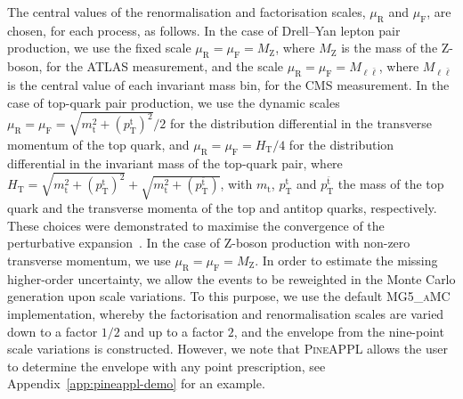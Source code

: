 The central values of the renormalisation and factorisation scales, $\mu_\mathrm{R}$ and
$\mu_\mathrm{F}$, are chosen, for each process, as follows. In the case of Drell--Yan
lepton pair production, we use the fixed scale $\mu_\mathrm{R}=\mu_\mathrm{F}=M_\mathrm{Z}$, where $M_\mathrm{Z}$ is
the mass of the Z-boson, for the ATLAS measurement, and the scale
$\mu_\mathrm{R}=\mu_\mathrm{F}=M_{\ell\bar\ell}$, where $M_{\ell\bar\ell}$ is the central value of each
invariant mass bin, for the CMS measurement.
In the case of top-quark pair production, we use the dynamic scales
$\mu_\mathrm{R}=\mu_\mathrm{F}=\sqrt{m_\mathrm{t}^2+(p_\mathrm{T}^\mathrm{t})^2}{\Big /}2$ for the distribution differential
in the transverse momentum of the top quark, and $\mu_\mathrm{R}=\mu_\mathrm{F}=H_\mathrm{T}/4$ for the
distribution differential in the invariant mass of the top-quark pair, where
$H_\mathrm{T}=\sqrt{m_\mathrm{t}^2+(p_\mathrm{T}^\mathrm{t})^2}+\sqrt{m_\mathrm{t}^2+(p_\mathrm{T}^{\bar{\mathrm{t}}})}$, with $m_\mathrm{t}$,
$p_\mathrm{T}^\mathrm{t}$ and $p_\mathrm{T}^{\bar{\mathrm{t}}}$ the mass of the top quark and the transverse momenta
of the top and antitop quarks, respectively. These choices were demonstrated
to maximise the convergence of the perturbative expansion~\cite{Czakon:2016dgf}.
In the case of Z-boson production with non-zero transverse momentum, we use
$\mu_\mathrm{R}=\mu_\mathrm{F}=M_\mathrm{Z}$. In order to estimate the missing higher-order uncertainty,
we allow the events to be reweighted in the Monte Carlo generation upon scale
variations. To this purpose, we use the default \textsc{MG5\_aMC}
implementation, whereby the factorisation and renormalisation scales
are varied down to a factor $1/2$ and up to a factor $2$, and the envelope
from the nine-point scale variations is constructed. However, we note that
\textsc{PineAPPL} allows the user to determine the envelope with any point
prescription, see Appendix~\ref{app:pineappl-demo} for an example.

